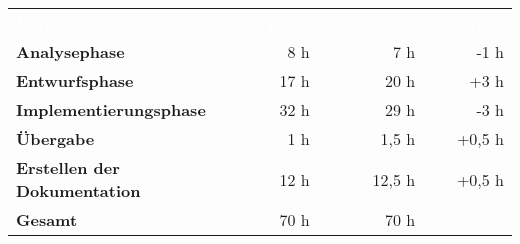 \begin{tabular}{lrrr}
\rowcolor{heading}\textcolor{white}{\textbf{Vorgang}} & \textcolor{white}{\textbf{Geplant}} & \textcolor{white}{\textbf{Tatsächlich}} & \textcolor{white}{\textbf{Differenz}} \\
\textbf{Analysephase} & 8 h   & 7 h  & -1 h \\
\rowcolor{odd}\textbf{Entwurfsphase} & 17 h  & 20 h  & +3 h  \\
\textbf{Implementierungsphase} & 32 h  & 29 h  & -3 h \\
\rowcolor{odd}\textbf{Übergabe} & 1 h   & 1,5 h   & +0,5 h \\
\textbf{Erstellen der Dokumentation} & 12 h   & 12,5 h  & +0,5 h \\
\hline
\hline
\rowcolor{odd}\textbf{Gesamt} & 70 h  & 70 h  &  \\
\end{tabular}
